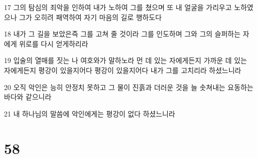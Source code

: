 \par 17 그의 탐심의 죄악을 인하여 내가 노하여 그를 쳤으며 또 내 얼굴을 가리우고 노하였으나 그가 오히려 패역하여 자기 마음의 길로 행하도다
\par 18 내가 그 길을 보았은즉 그를 고쳐 줄 것이라 그를 인도하며 그와 그의 슬퍼하는 자에게 위로를 다시 얻게하리라
\par 19 입술의 열매를 짓는 나 여호와가 말하노라 먼 데 있는 자에게든지 가까운 데 있는 자에게든지 평강이 있을지어다 평강이 있을지어다 내가 그를 고치리라 하셨느니라
\par 20 오직 악인은 능히 안정치 못하고 그 물이 진흙과 더러운 것을 늘 솟쳐내는 요동하는 바다와 같으니라
\par 21 내 하나님의 말씀에 악인에게는 평강이 없다 하셨느니라

\chapter{58}

